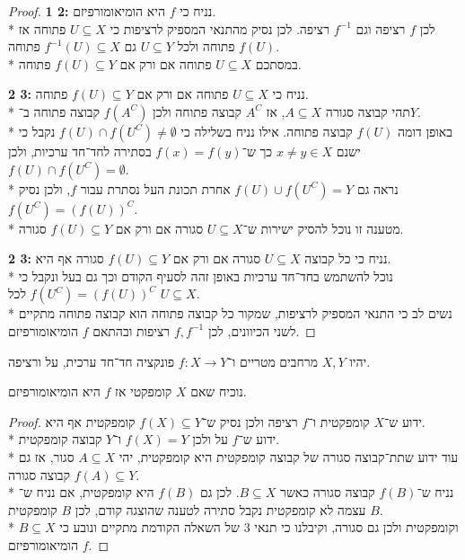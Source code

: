 \begin{proof}
	\textbf{1 \leftarrow{} 2:}
	נניח כי $f$ היא הומיאומורפיזם. \\*
	לכן $f$ רציפה וגם $f^{-1}$ רציפה. לכן נסיק מהתנאי המספיק לרציפות כי $U \subseteq X$ פתוחה אז $f(U)$ פתוחה ולכל $U \subseteq Y$ גם $f^{-1}(U) \subseteq X$ פתוחה. \\*
	במסתכם $U \subseteq X$ פתוחה אם ורק אם $f(U) \subseteq Y$ פתוחה.

	\textbf{2 \leftarrow{} 3:}
	נניח כי $U \subseteq X$ פתוחה אם ורק אם $f(U) \subseteq Y$ פתוחה. \\*
	תהי קבוצה סגורה $A \subseteq X$, אז $A^C$ קבוצה פתוחה ולכן $f(A^C)$ קבוצה פתוחה ב־$Y$. \\*
	באופן דומה $f(U)$ קבוצה פתוחה. אילו נניח בשלילה כי $f(U) \cap f(U^C) \ne \emptyset$ נקבל כי ישנם $x \ne y \in X$ כך ש־$f(x) = f(y)$ בסתירה לחד־חד ערכיות, ולכן $f(U) \cap f(U^C) = \emptyset$. \\*
	נראה גם $f(U) \cup f(U^C) = Y$ אחרת תכונת העל נסתרת עבור $f$, ולכן נסיק $f(U^C) = {(f(U))}^C$. \\*
	מטענה זו נוכל להסיק ישירות ש־$U \subseteq X$ סגורה אם ורק אם $f(U) \subseteq Y$ סגורה.

	\textbf{2 \leftarrow{} 3:}
	נניח כי כל קבוצה $U \subseteq X$ סגורה אם ורק אם $f(U) \subseteq Y$ סגורה אף היא. \\*
	נוכל להשתמש בחד־חד ערכיות באופן זהה לסעיף הקודם וכך גם בעל ונקבל כי $f(U^C) = {(f(U))}^C$ לכל $U \subseteq X$. \\*
	נשים לב כי התנאי המספיק לרציפות, שמקור כל קבוצה פתוחה הוא קבוצה פתוחה מתקיים לשני הכיוונים, לכן $f, f^{-1}$ רציפות ובהתאם $f$ הומיאומורפיזם.
\end{proof}

\Question{}
יהיו $X, Y$ מרחבים מטריים ו־$f : X \to Y$ פונקציה חד־חד ערכית, על ורציפה.

\Subquestion{}
נוכיח שאם $X$ קומפקטי אז $f$ היא הומיאומורפיזם.
\begin{proof}
	ידוע ש־$X$ קומפקטית ו־$f$ רציפה ולכן נסיק ש־$f(X) \subseteq Y$ קומפקטית אף היא. \\*
	ידוע ש־$f$ על ולכן $f(X) = Y$ ו־$Y$ קבוצה קומפקטית. \\*
	עוד ידוע שתת־קבוצה סגורה של קבוצה קומפקטית היא קומפקטית, יהי $A \subseteq X$ סגור, אז גם $f(A) \subseteq Y$ קבוצה סגורה. \\*
	נניח ש־$f(B)$ קבוצה סגורה כאשר $B \subseteq X$. לכן גם $f(B)$ היא קומפקטית, אם נניח ש־$B$ עצמה לא קומפקטית נקבל סתירה לטענה שהוצגה קודם, לכן $B$ קומפקטית. \\*
	$B \subseteq X$ וקומפקטית ולכן גם סגורה, וקיבלנו כי תנאי 3 של השאלה הקודמת מתקיים ונובע כי $f$ הומיאומורפיזם.
\end{proof}

